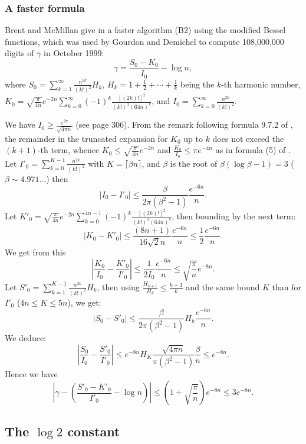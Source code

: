 \documentclass[12pt]{amsart}
\begin{document}
\subsubsection{A faster formula}

Brent and McMillan give in \cite{BrMc80} a faster algorithm (B2) using the
modified Bessel functions, which was
used by Gourdon and Demichel to compute 108,000,000 digits of $\gamma$ in
October 1999:
\[ \gamma = \frac{S_0 - K_0}{I_0} - \log n, \]
where $S_0 = \sum_{k=1}^{\infty} \frac{n^{2k}}{(k!)^2} H_k$,
$H_k = 1 + \frac{1}{2} + \cdots + \frac{1}{k}$ being the $k$-th harmonic
number,
$K_0 = \sqrt{\frac{\pi}{4n}} e^{-2n} \sum_{k=0}^{\infty}
        (-1)^k \frac{[(2k)!]^2}{(k!)^3 (64n)^k}$,
and $I_0 = \sum_{k=0}^{\infty} \frac{n^{2k}}{(k!)^2}$.

We have $I_0 \ge \frac{e^{2n}}{\sqrt{4 \pi n}}$ (see \cite{BrMc80} page 306).
From the remark following formula 9.7.2 of \cite{AbSt73},
the remainder in the truncated expansion for $K_0$ up to $k$ does not
exceed the $(k+1)$-th term, whence
$K_0 \le \sqrt{\frac{\pi}{4n}} e^{-2n}$ and
$\frac{K_0}{I_0} \le \pi e^{-4n}$ as in formula (5) of \cite{BrMc80}.
Let $I'_0 = \sum_{k=0}^{K-1} \frac{n^{2k}}{(k!)^2}$ with
$K = \lceil \beta n \rceil$, and $\beta$ is the root of
$\beta (\log \beta - 1) = 3$
($\beta \sim 4.971\ldots$) then
\[ |I_0 - I'_0| \le \frac{\beta}{2 \pi (\beta^2-1)} \frac{e^{-6n}}{n}. \]
Let $K'_0 = \sqrt{\frac{\pi}{4n}} e^{-2n} \sum_{k=0}^{4n-1} (-1)^k
        \frac{[(2k)!]^2}{(k!)^3 (64n)^k}$, then bounding by the next term:
\[ |K_0 - K'_0| \le \frac{(8n+1)}{16 \sqrt{2} n} \frac{e^{-6n}}{n}
        \le \frac{1}{2} \frac{e^{-6n}}{n}. \]
We get from this
\[ \left| \frac{K_0}{I_0} - \frac{K'_0}{I'_0} \right|
        \le \frac{1}{2 I_0} \frac{e^{-6n}}{n} \le \sqrt{\frac{\pi}{n}}
        e^{-8n}. \]
Let $S'_0 = \sum_{k=1}^{K-1} \frac{n^{2k}}{(k!)^2} H_k$,
then using $\frac{H_{k+1}}{H_k} \le \frac{k+1}{k}$ and the same bound $K$
than for $I'_0$ ($4n \le K \le 5n$), we get:
\[ |S_0 - S'_0| \le \frac{\beta}{2 \pi (\beta^2-1)} H_k \frac{e^{-6n}}{n}. \]
We deduce:
\[ \left| \frac{S_0}{I_0} - \frac{S'_0}{I'_0} \right|
        \le e^{-8n} H_K \frac{\sqrt{4 \pi n}}{\pi (\beta^2-1)}
        \frac{\beta}{n} \le e^{-8n}. \]
Hence we have
\[ \left| \gamma - \left( \frac{S'_0 - K'_0}{I'_0} - \log n \right) \right|
        \le (1 + \sqrt{\frac{\pi}{n}}) e^{-8n}
        \le 3 e^{-8n}. \]

\subsection{The $\log 2$ constant}
\end{document}
